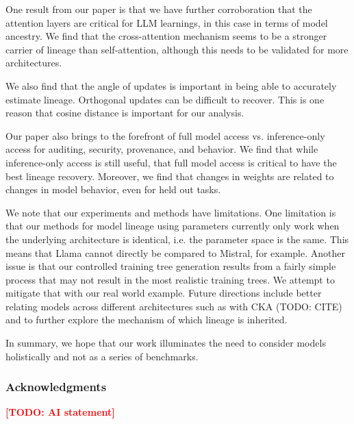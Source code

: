 \documentclass{article}
\theoremstyle{definition}
\theoremstyle{plain}
\newcommand{\TODO}[1]{\textcolor{red}{\textbf{[TODO: #1]}}}
\begin{document}
One result from our paper is that we have further corroboration that the attention layers are critical for LLM learnings, in this case in terms of model ancestry.  We find that the cross-attention mechanism seems to be a stronger carrier of lineage than self-attention, although this needs to be validated  for more architectures.  

We also find that the angle of updates is important in being able to accurately estimate lineage.  Orthogonal updates can be difficult to recover.  This is one reason that cosine distance is important for our analysis.

Our paper also brings to the forefront of full model access vs. inference-only access for auditing, security, provenance, and behavior. We find that while inference-only access is still useful, that full model access is critical to have the best lineage recovery.  Moreover, we find that changes in weights are related to changes in model behavior, even for held out tasks.  

We note that our experiments and methods have limitations.  One limitation is that our methods for model lineage using parameters currently only work when the underlying architecture is identical, i.e. the parameter space is the same.  This means that Llama cannot directly be compared to Mistral, for example. Another issue is that our controlled training tree generation results from a fairly simple process that may not result in the most realistic training trees.  We attempt to mitigate that with our real world example. Future directions include better relating models across different architectures such as with CKA (TODO: CITE) and to further explore the mechanism of which lineage is inherited.

In summary, we hope that our work illuminates the need to consider models holistically and not as a series of benchmarks.


\subsubsection*{Acknowledgments}
\TODO{AI statement}





\appendix
\end{document}
